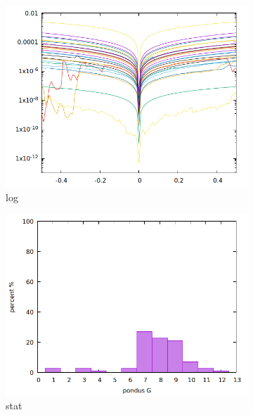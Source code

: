 \begin{figure}
    \begin{subfigure}{.3\textwidth}
        \includegraphics[width=\textwidth]{Pics/iv/log-156-bad-3x3F.png}
        \caption{log} \label{fig:log3}
    \end{subfigure}
    \begin{subfigure}{.3\textwidth}
        \includegraphics[width=\textwidth]{Pics/iv/stat-146-good-10x1F.png}
        \caption{stat} \label{fig:stat1}
    \end{subfigure}
    \begin{subfigure}{.3\textwidth}

\end{subfigure}
\end{figure}
